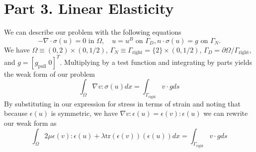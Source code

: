 \documentclass{article}
\begin{document}
\section*{Part 3. Linear Elasticity}
We can describe our problem with the following equations
\begin{equation*}
	-\nabla \cdot \sigma(u) = 0 \text{ in } \Omega, \quad u = u^B \text{ on } \Gamma_D, n\cdot \sigma(u) = g \text{ on } \Gamma_N.
\end{equation*}
We have \(\Omega \equiv (0,2)\times(0,1/2) \), \(\Gamma_N \equiv \Gamma_\text{right} = \{2\}\times(0,1/2) \), \(\Gamma_D = \partial\Omega/\Gamma_\text{right} \), and \(g = \left[g_{\text{pull}}\; 0\right]^T \). Multiplying by a test function and integrating by parts yields the weak form of our problem
\begin{equation*}
	\int_{\Omega} \nabla v : \sigma(u)dx = \int_{\Gamma_\text{right}}v\cdot gds
\end{equation*}
By substituting in our expression for stress in terms of strain and noting that because \(\epsilon(u)\) is symmetric, we have \(\nabla v : \epsilon(u) = \epsilon(v):\epsilon(u) \) we can rewrite our weak form as
\begin{equation*}
	\int_{\Omega} 2 \mu \epsilon(v):\epsilon(u) + \lambda\text{tr}(\epsilon(v))(\epsilon(u))dx = \int_{\Gamma_\text{right}}v\cdot gds
\end{equation*}
\end{document}
